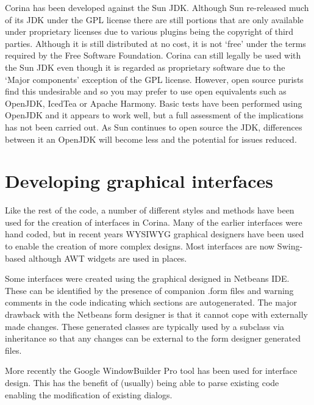Corina has been developed against the Sun JDK.  Although Sun re-released much of its JDK under the GPL license there are still portions that are only available under  proprietary licenses due to various plugins being the copyright of third parties.  Although it is still distributed at no cost, it is not `free' under the terms required by the Free Software Foundation.  Corina can still legally be used with the Sun JDK even though it is regarded as proprietary software due to the `Major components' exception of the GPL license.  However, open source purists find this undesirable and so you may prefer to use open equivalents such as OpenJDK, IcedTea or Apache Harmony.   Basic tests have been performed using OpenJDK and it appears to work well, but a full assessment of the implications has not been carried out.  As Sun continues to open source the JDK, differences between it an OpenJDK will become less and the potential for issues reduced.


\section{Developing graphical interfaces}
Like the rest of the code, a number of different styles and methods have been used for the creation of interfaces in Corina.  Many of the earlier interfaces were hand coded, but in recent years WYSIWYG graphical designers have been used to enable the creation of more complex designs.  Most interfaces are now Swing-based although AWT widgets are used in places.

Some interfaces were created using the graphical designed in Netbeans IDE.  These can be identified by the presence of companion .form files and warning comments in the code indicating which sections are autogenerated.  The major drawback with the Netbeans form designer is that it cannot cope with externally made changes.  These generated classes are typically used by a subclass via inheritance so that any changes can be external to the form designer generated files.  

More recently the Google WindowBuilder Pro tool has been used for interface design.  This has the benefit of (usually) being able to parse existing code enabling the modification of existing dialogs.




